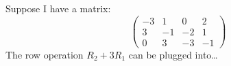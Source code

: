\documentclass{ximera}
\author{Bart Snapp}
\begin{document}
\begin{exercise}
  Suppose I have a matrix:
  \[
  \begin{pmatrix}
    -3 & 1 & 0 & 2 \\
    3 & -1 & -2 & 1 \\
    0 & 3 & -3 & -1
  \end{pmatrix}
  \]
  The row operation $R_2+3R_1$ can be plugged into\dots
  \begin{selectAll}
  \end{selectAll}
\end{exercise}
\end{document}
